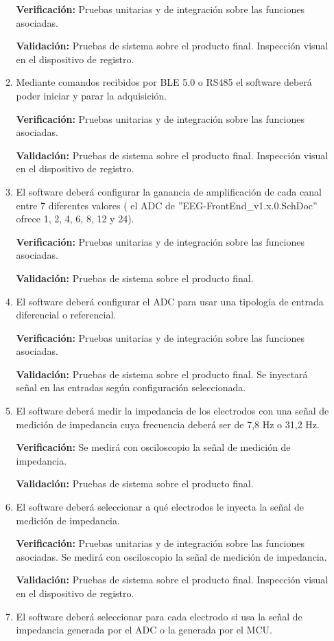 \documentclass[
11pt, %
codirector, %
]{charter}
\begin{document}
\begin{enumerate}
\begin{enumerate}
			\textbf{Verificación:} Pruebas unitarias y de integración sobre las funciones asociadas.
			
			\textbf{Validación:} Pruebas de sistema sobre el producto final. Inspección visual en el dispositivo de registro.
			\item Mediante comandos recibidos por BLE 5.0 o RS485 el software deberá poder iniciar y parar la adquisición.
			
			\textbf{Verificación:} Pruebas unitarias y de integración sobre las funciones asociadas.
			
			\textbf{Validación:} Pruebas de sistema sobre el producto final. Inspección visual en el dispositivo de registro.
			\item El software deberá configurar la ganancia de amplificación de cada canal entre 7 diferentes valores ( el ADC de ''EEG-FrontEnd\_v1.x.0.SchDoc” ofrece 1, 2, 4, 6, 8, 12 y 24).
			
			\textbf{Verificación:} Pruebas unitarias y de integración sobre las funciones asociadas.
			
			\textbf{Validación:} Pruebas de sistema sobre el producto final.
			\item El software deberá configurar el ADC para usar una tipología de entrada diferencial o referencial.
			
			\textbf{Verificación:} Pruebas unitarias y de integración sobre las funciones asociadas.
			
			\textbf{Validación:} Pruebas de sistema sobre el producto final. Se inyectará señal en las entradas según configuración seleccionada.
			\item El software deberá medir la impedancia de los electrodos con una señal de medición de impedancia cuya frecuencia deberá ser de 7,8 Hz o 31,2 Hz.
			
			\textbf{Verificación:} Se medirá con osciloscopio la señal de medición de impedancia.
			
			\textbf{Validación:} Pruebas de sistema sobre el producto final.
			\item El software deberá seleccionar a qué electrodos le inyecta la señal de medición de impedancia.
			
			\textbf{Verificación:} Pruebas unitarias y de integración sobre las funciones asociadas. Se medirá con osciloscopio la señal de medición de impedancia.
			
			\textbf{Validación:} Pruebas de sistema sobre el producto final. Inspección visual en el dispositivo de registro.
			\item El software deberá seleccionar para cada electrodo si usa la señal de impedancia generada por el ADC o la generada por el MCU.
			

\end{enumerate}
\end{enumerate}
\end{document}
